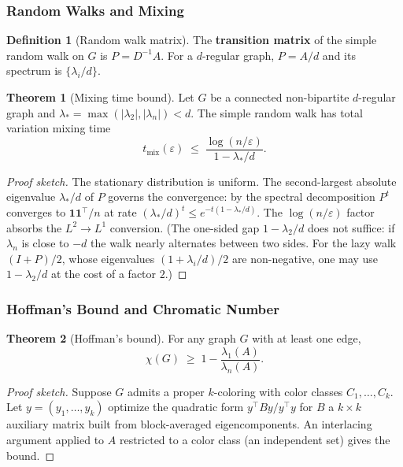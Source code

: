 \documentclass{article}
\theoremstyle{definition}
\newtheorem{theorem}{Theorem}
\newtheorem{definition}{Definition}
\begin{document}
\subsubsection{Random Walks and Mixing}

\begin{definition}[Random walk matrix]
The \textbf{transition matrix} of the simple random walk on $G$ is
$P = D^{-1} A$. For a $d$-regular graph, $P = A/d$ and its spectrum
is $\{\lambda_i/d\}$.
\end{definition}

\begin{theorem}[Mixing time bound]\label{thm:mixing}
Let $G$ be a connected non-bipartite $d$-regular graph and
$\lambda_* = \max(|\lambda_2|, |\lambda_n|) < d$. The simple
random walk has total variation mixing time
\[
  t_{\mathrm{mix}}(\varepsilon) \;\le\; \frac{\log(n/\varepsilon)}{1 - \lambda_*/d}.
\]
\end{theorem}

\begin{proof}[Proof sketch]
The stationary distribution is uniform. The second-largest absolute
eigenvalue $\lambda_*/d$ of $P$ governs the convergence: by the spectral
decomposition $P^t$ converges to $\mathbf 1 \mathbf 1^\top/n$ at rate
$(\lambda_*/d)^t \le e^{-t(1 - \lambda_*/d)}$.
The $\log(n/\varepsilon)$ factor absorbs the $L^2 \to L^1$ conversion.
(The one-sided gap $1 - \lambda_2/d$ does not suffice: if $\lambda_n$ is close
to $-d$ the walk nearly alternates between two sides. For the lazy walk
$(I + P)/2$, whose eigenvalues $(1 + \lambda_i/d)/2$ are non-negative, one may
use $1 - \lambda_2/d$ at the cost of a factor $2$.)
\end{proof}

\subsubsection{Hoffman's Bound and Chromatic Number}

\begin{theorem}[Hoffman's bound]\label{thm:hoffman}
For any graph $G$ with at least one edge,
\[
  \chi(G) \;\ge\; 1 - \frac{\lambda_1(A)}{\lambda_n(A)}.
\]
\end{theorem}

\begin{proof}[Proof sketch]
Suppose $G$ admits a proper $k$-coloring with color classes $C_1, \dots, C_k$.
Let $y = (y_1, \dots, y_k)$ optimize the quadratic form
$y^\top B y / y^\top y$ for $B$ a $k \times k$ auxiliary matrix
built from block-averaged eigencomponents. An interlacing argument
applied to $A$ restricted to a color class (an independent set) gives
the bound.
\end{proof}
\end{document}
